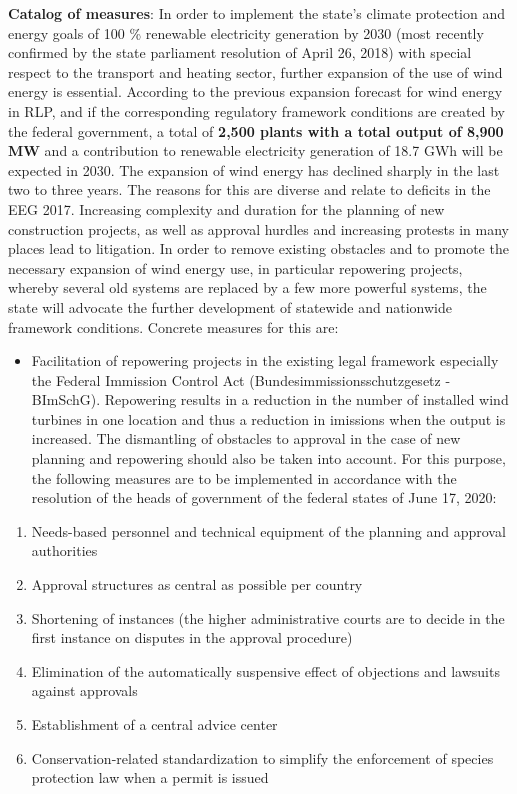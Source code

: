 \documentclass[a4paper,11pt]{article}
\providecommand{\tightlist}{%
  \setlength{\itemsep}{0pt}\setlength{\parskip}{0pt}}
\begin{document}
\textbf{Catalog of measures}: In order to implement the state's climate protection and energy goals of 100 \% renewable electricity generation by 2030 (most recently confirmed by the state parliament resolution of April 26, 2018) with special respect to the transport and heating sector, further expansion of the use of wind energy is essential. According to the previous expansion forecast for wind energy in RLP, and if the corresponding regulatory framework conditions are created by the federal government, a total of \textbf{2,500 plants with a total output of 8,900 MW} and a contribution to renewable electricity generation of 18.7 GWh will be expected in 2030. The expansion of wind energy has declined sharply in the last two to three years. The reasons for this are diverse and relate to deficits in the EEG 2017. Increasing complexity and duration for the planning of new construction projects, as well as approval hurdles and increasing protests in many places lead to litigation. In order to remove existing obstacles and to promote the necessary expansion of wind energy use, in particular repowering projects, whereby several old systems are replaced by a few more powerful systems, the state will advocate the further development of statewide and nationwide framework conditions. Concrete measures for this are:
\begin{itemize}
\tightlist
\item
  Facilitation of repowering projects in the existing legal framework especially the Federal Immission Control Act (Bundesimmissionsschutzgesetz - BImSchG). Repowering results in a reduction in the number of installed wind turbines in one location and thus a reduction in imissions when the output is increased. The dismantling of obstacles to approval in the case of new planning and repowering should also be taken into account.
  For this purpose, the following measures are to be implemented in accordance with the resolution of the heads of government of the federal states of June 17, 2020:
\end{itemize}
\begin{enumerate}
\def\labelenumi{\arabic{enumi}.}
\tightlist
\item
  Needs-based personnel and technical equipment of the planning and approval authorities
\item
  Approval structures as central as possible per country
\item
  Shortening of instances (the higher administrative courts are to decide in the first instance on disputes in the approval procedure)
\item
  Elimination of the automatically suspensive effect of objections and lawsuits against approvals
\item
  Establishment of a central advice center
\item
  Conservation-related standardization to simplify the enforcement of species protection law when a permit is issued
\end{enumerate}
\end{document}
